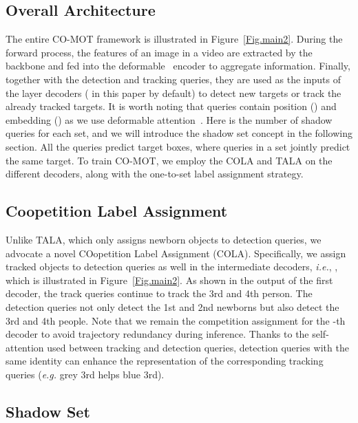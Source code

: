 \documentclass{article}
\begin{document}
\subsection{Overall Architecture}
The entire CO-MOT framework is illustrated in Figure~\ref{Fig.main2}. During the forward process, the features of an image in a video are extracted by the backbone and fed into the deformable~\cite{zhu2020deformable} encoder to aggregate information. Finally, together with the detection and tracking queries, they are used as the inputs of the  layer decoders  ( in this paper by default) to detect new targets or track the already tracked targets. It is worth noting that queries contain  position () and embedding () as we use deformable attention~\cite{zhu2020deformable}. Here  is the number of shadow queries for each set, and we will introduce the shadow set concept in the following section. All the queries predict  target boxes, where  queries in a set jointly predict the same target. To train CO-MOT, we employ the COLA and TALA on the different decoders, along with the one-to-set label assignment strategy.

\subsection{Coopetition Label Assignment}
Unlike TALA, which only assigns newborn objects to detection queries, we advocate a novel COopetition Label Assignment (COLA). Specifically, we assign  tracked objects  to detection queries as well in the intermediate decoders, \textit{i.e.}, , which is illustrated in Figure~\ref{Fig.main2}. As shown in the output of the first decoder, the track queries continue to track the 3rd and 4th person. The detection queries not only detect the 1st and 2nd newborns but also detect the 3rd and 4th people. Note that we remain the competition assignment for the -th decoder to avoid trajectory redundancy during inference. Thanks to the self-attention used between tracking and detection queries, detection queries with the same identity can enhance the representation of the corresponding tracking queries (\textit{e.g.} grey 3rd helps blue 3rd). 


















\subsection{Shadow Set }
\end{document}
